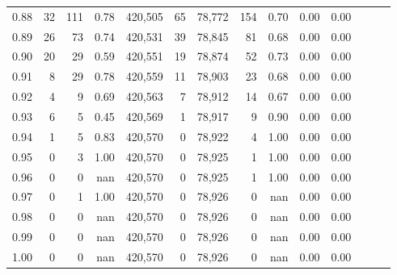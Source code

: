\begin{tabular}{rrrrrrrrrrrrrr}
0.88 &      32 &    111 &  0.78 &  420,505 &       65 &  78,772 &     154 &  0.70 &  0.00 &      0.00 \\
0.89 &      26 &     73 &  0.74 &  420,531 &       39 &  78,845 &      81 &  0.68 &  0.00 &      0.00 \\
0.90 &      20 &     29 &  0.59 &  420,551 &       19 &  78,874 &      52 &  0.73 &  0.00 &      0.00 \\
0.91 &       8 &     29 &  0.78 &  420,559 &       11 &  78,903 &      23 &  0.68 &  0.00 &      0.00 \\
0.92 &       4 &      9 &  0.69 &  420,563 &        7 &  78,912 &      14 &  0.67 &  0.00 &      0.00 \\
0.93 &       6 &      5 &  0.45 &  420,569 &        1 &  78,917 &       9 &  0.90 &  0.00 &      0.00 \\
0.94 &       1 &      5 &  0.83 &  420,570 &        0 &  78,922 &       4 &  1.00 &  0.00 &      0.00 \\
0.95 &       0 &      3 &  1.00 &  420,570 &        0 &  78,925 &       1 &  1.00 &  0.00 &      0.00 \\
0.96 &       0 &      0 &   nan &  420,570 &        0 &  78,925 &       1 &  1.00 &  0.00 &      0.00 \\
0.97 &       0 &      1 &  1.00 &  420,570 &        0 &  78,926 &       0 &   nan &  0.00 &      0.00 \\
0.98 &       0 &      0 &   nan &  420,570 &        0 &  78,926 &       0 &   nan &  0.00 &      0.00 \\
0.99 &       0 &      0 &   nan &  420,570 &        0 &  78,926 &       0 &   nan &  0.00 &      0.00 \\
1.00 &       0 &      0 &   nan &  420,570 &        0 &  78,926 &       0 &   nan &  0.00 &      0.00 \\
\bottomrule
\end{tabular}
